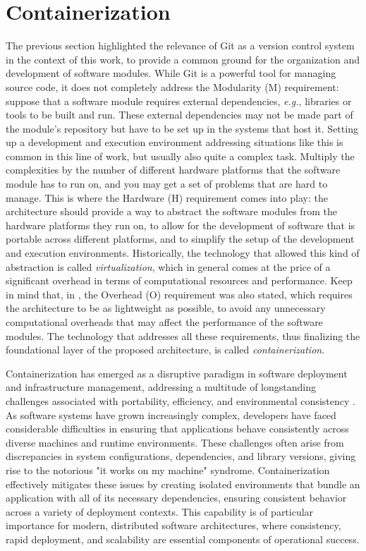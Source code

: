\section{Containerization}
\label{sec:containerization}
The previous section highlighted the relevance of Git as a version control system in the context of this work, to provide a common ground for the organization and development of software modules. While Git is a powerful tool for managing source code, it does not completely address the Modularity (M) requirement: suppose that a software module requires external dependencies, \emph{e.g.}, libraries or tools to be built and run. These external dependencies may not be made part of the module's repository but have to be set up in the systems that host it. Setting up a development and execution environment addressing situations like this is common in this line of work, but usually also quite a complex task. Multiply the complexities by the number of different hardware platforms that the software module has to run on, and you may get a set of problems that are hard to manage. This is where the Hardware (H) requirement comes into play: the architecture should provide a way to abstract the software modules from the hardware platforms they run on, to allow for the development of software that is portable across different platforms, and to simplify the setup of the development and execution environments. Historically, the technology that allowed this kind of abstraction is called \emph{virtualization}, which in general comes at the price of a significant overhead in terms of computational resources and performance. Keep in mind that, in , the Overhead (O) requirement was also stated, which requires the architecture to be as lightweight as possible, to avoid any unnecessary computational overheads that may affect the performance of the software modules. The technology that addresses all these requirements, thus finalizing the foundational layer of the proposed architecture, is called \emph{containerization}.

Containerization has emerged as a disruptive paradigm in software deployment and infrastructure management, addressing a multitude of longstanding challenges associated with portability, efficiency, and environmental consistency \cite{pahl_cloud_2019}. As software systems have grown increasingly complex, developers have faced considerable difficulties in ensuring that applications behave consistently across diverse machines and runtime environments. These challenges often arise from discrepancies in system configurations, dependencies, and library versions, giving rise to the notorious "it works on my machine" syndrome. Containerization effectively mitigates these issues by creating isolated environments that bundle an application with all of its necessary dependencies, ensuring consistent behavior across a variety of deployment contexts. This capability is of particular importance for modern, distributed software architectures, where consistency, rapid deployment, and scalability are essential components of operational success.

